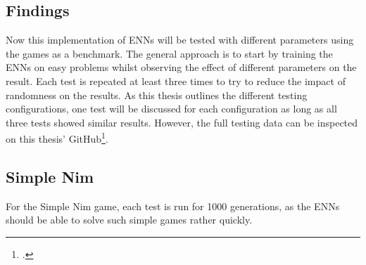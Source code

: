 \documentclass[11pt]{report}
\begin{document}
\begin{enumerate}
    \section{Findings}\label{sec:first-findings}
    Now this implementation of ENNs will be tested with different parameters using the games as a benchmark.
    The general approach is to start by training the ENNs on easy problems whilst observing the effect of different parameters on the result.
    Each test is repeated at least three times to try to reduce the impact of randomness on the results.
    As this thesis outlines the different testing configurations, one test will be discussed for each configuration as long as all three tests showed similar results.
    However, the full testing data can be inspected on this thesis' GitHub\footcite{RustENN}.

    \subsection{Simple Nim}\label{subsec:simple-nim-results}
    For the Simple Nim game, each test is run for 1000 generations, as the ENNs should be able to solve such simple games rather quickly.


\end{enumerate}
\end{document}

